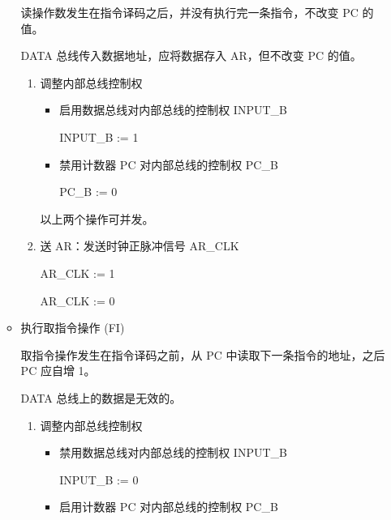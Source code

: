 \begin{enumerate}
\begin{itemize}
        读操作数发生在指令译码之后，并没有执行完一条指令，不改变 PC 的值。
        
        DATA 总线传入数据地址，应将数据存入 AR，但不改变 PC 的值。
        
        \begin{enumerate}
            \item 调整内部总线控制权
            
            \begin{itemize}
                \item 启用数据总线对内部总线的控制权 INPUT\_B
                
                INPUT\_B := 1
                
                \item 禁用计数器 PC 对内部总线的控制权 PC\_B
                
                PC\_B := 0
                
            \end{itemize}
            
            以上两个操作可并发。
            
            \item 送 AR：发送时钟正脉冲信号 AR\_CLK
            
            AR\_CLK := 1
            
            AR\_CLK := 0
            
        \end{enumerate}
        
        \item 执行取指令操作 (FI)
        
        取指令操作发生在指令译码之前，从 PC 中读取下一条指令的地址，之后 PC 应自增 1。
        
        DATA 总线上的数据是无效的。
        
        \begin{enumerate}
            \item 调整内部总线控制权
            
            \begin{itemize}
                \item 禁用数据总线对内部总线的控制权 INPUT\_B
                
                INPUT\_B := 0
                
                \item 启用计数器 PC 对内部总线的控制权 PC\_B
                

\end{itemize}
\end{enumerate}
\end{itemize}
\end{enumerate}
